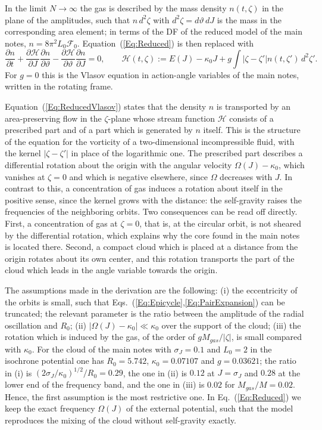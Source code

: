 \documentclass[prd,aps,nofootinbib,superscriptaddress,amsmath,amssymb]{revtex4}
\begin{document}
In the limit $N\to \infty$ the gas is described by the mass density $n(t,\zeta)$ in the plane of the amplitudes, such that $n\, d^2\zeta$ with $d^2\zeta = d\vartheta\, dJ$ is the mass in the corresponding area element; in terms of the DF of the reduced model of the main notes, $n = 8\pi^2 L_0\mathcal{F}_0$. Equation~(\ref{Eq:Reduced}) is then replaced with
\begin{equation}
\frac{\partial n}{\partial t} + \frac{\partial\mathcal{H}}{\partial J}\frac{\partial n}{\partial\vartheta} - \frac{\partial\mathcal{H}}{\partial\vartheta}\frac{\partial n}{\partial J} = 0,\qquad
\mathcal{H}(t,\zeta) := E(J) - \kappa_0 J + g\int \left| \zeta - \zeta' \right| n(t,\zeta')\, d^2\zeta'.
\label{Eq:ReducedVlasov}
\end{equation}
For $g = 0$ this is the Vlasov equation in action-angle variables of the main notes, written in the rotating frame.

Equation~(\ref{Eq:ReducedVlasov}) states that the density $n$ is transported by an area-preserving flow in the $\zeta$-plane whose stream function $\mathcal{H}$ consists of a prescribed part and of a part which is generated by $n$ itself. This is the structure of the equation for the vorticity of a two-dimensional incompressible fluid, with the kernel $|\zeta - \zeta'|$ in place of the logarithmic one. The prescribed part describes a differential rotation about the origin with the angular velocity $\Omega(J) - \kappa_0$, which vanishes at $\zeta = 0$ and which is negative elsewhere, since $\Omega$ decreases with $J$. In contrast to this, a concentration of gas induces a rotation about itself in the positive sense, since the kernel grows with the distance: the self-gravity raises the frequencies of the neighboring orbits. Two consequences can be read off directly. First, a concentration of gas at $\zeta = 0$, that is, at the circular orbit, is not sheared by the differential rotation, which explains why the core found in the main notes is located there. Second, a compact cloud which is placed at a distance from the origin rotates about its own center, and this rotation transports the part of the cloud which leads in the angle variable towards the origin.

The assumptions made in the derivation are the following: (i) the eccentricity of the orbits is small, such that Eqs.~(\ref{Eq:Epicycle},\ref{Eq:PairExpansion}) can be truncated; the relevant parameter is the ratio between the amplitude of the radial oscillation and $R_0$; (ii) $|\Omega(J) - \kappa_0|\ll\kappa_0$ over the support of the cloud; (iii) the rotation which is induced by the gas, of the order of $g M_{gas}/|\zeta|$, is small compared with $\kappa_0$. For the cloud of the main notes with $\sigma_J = 0.1$ and $L_0 = 2$ in the isochrone potential one has $R_0 = 5.742$, $\kappa_0 = 0.07107$ and $g = 0.03621$; the ratio in (i) is $(2\sigma_J/\kappa_0)^{1/2}/R_0 = 0.29$, the one in (ii) is $0.12$ at $J = \sigma_J$ and $0.28$ at the lower end of the frequency band, and the one in (iii) is $0.02$ for $M_{gas}/M = 0.02$. Hence, the first assumption is the most restrictive one. In Eq.~(\ref{Eq:Reduced}) we keep the exact frequency $\Omega(J)$ of the external potential, such that the model reproduces the mixing of the cloud without self-gravity exactly.
\end{document}
